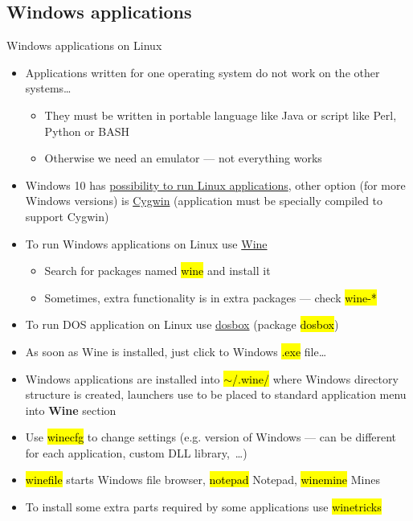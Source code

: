 \documentclass[compress, ucs, xelatex, 11pt, xcolor=svgnames,
  hyperref={
    bookmarks=true,
    unicode=true,
    colorlinks=true,
    pdftitle={Linux, command line and MetaCentrum},
    plainpages=false,
    pdfauthor={Vojtech Zeisek},
    pdfsubject={Course about use of Linux command line, writing shell scripts and using MetaCentrum of CESNET},
    pdfcreator={XeLaTeX},
    pdfkeywords={Linux, GNU, BASH, shell, command line, MetaCentrum},
    linkcolor=DarkRed,
    anchorcolor=DarkBlue,
    citecolor=Indigo,
    filecolor=NavyBlue,
    menucolor=DarkMagenta,
    urlcolor=DarkBlue,
    pdftex},
  url={hyphens, lowtilde} %
  ]{beamer}
\renewcommand{\texttt}[1]{\hl{\ttfamily #1}}
\begin{document}
\subsection{Windows applications} %

\begin{frame}[allowframebreaks]{Windows applications on Linux}
  \begin{itemize}
    \item Applications written for one operating system do not work on the other systems\ldots
    \begin{itemize}
      \item They must be written in portable language like Java or script like Perl, Python or BASH
      \item Otherwise we need an emulator --- not everything works
    \end{itemize}
    \item Windows 10 has \href{https://docs.microsoft.com/windows/wsl/install-win10}{possibility to run Linux applications}, other option (for more Windows versions) is \href{https://www.cygwin.com/}{Cygwin} (application must be specially compiled to support Cygwin)
    \item To run Windows applications on Linux use \href{https://www.winehq.org/}{Wine}
    \begin{itemize}
      \item Search for packages named \texttt{wine} and install it
      \item Sometimes, extra functionality is in extra packages --- check \texttt{wine-*}
    \end{itemize}
    \item To run DOS application on Linux use \href{https://www.dosbox.com/}{dosbox} (package \texttt{dosbox})
    \item As soon as Wine is installed, just click to Windows \texttt{*.exe} file\ldots
    \item Windows applications are installed into \texttt{$\sim$/.wine/} where Windows directory structure is created, launchers use to be placed to standard application menu into \textbf{Wine} section
    \item Use \texttt{winecfg} to change settings (e.g. version of Windows --- can be different for each application, custom DLL library,~\ldots)
    \item \texttt{winefile} starts Windows file browser, \texttt{notepad} Notepad, \texttt{winemine} Mines
    \item To install some extra parts required by some applications use \texttt{winetricks}

\end{itemize}
\end{frame}
\end{document}
